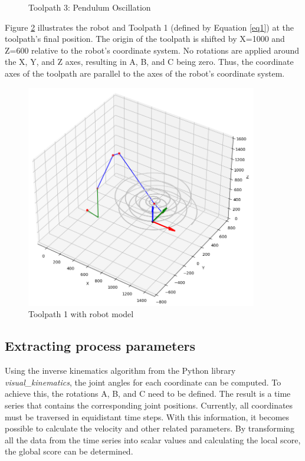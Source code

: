 \begin{figure}[H]
	\caption{Toolpath 3: Pendulum Oscillation}
	\label{path3}
\end{figure}


Figure \ref{TP1robot} illustrates the robot and Toolpath 1 (defined by Equation \ref{eq1}) at the toolpath's final position. The origin of the toolpath is shifted by X=1000 and Z=600 relative to the robot's coordinate system. No rotations are applied around the X, Y, and Z axes, resulting in A, B, and C being zero. Thus, the coordinate axes of the toolpath are parallel to the axes of the robot's coordinate system.



\begin{figure}[H]
	\centerline{\includegraphics[width=0.9\textwidth]{figures/robotANDpath1.png}}
	\caption{Toolpath 1 with robot model}
	\label{TP1robot}
\end{figure}




\subsection{Extracting process parameters}
Using the inverse kinematics algorithm from the Python library \textit{visual\_kinematics}, the joint angles for each coordinate can be computed. To achieve this, the rotations A, B, and C need to be defined. The result is a time series that contains the corresponding joint positions. Currently, all coordinates must be traversed in equidistant time steps. With this information, it becomes possible to calculate the velocity and other related parameters. By transforming all the data from the time series into scalar values and calculating the local score, the global score can be determined.
\newpage

